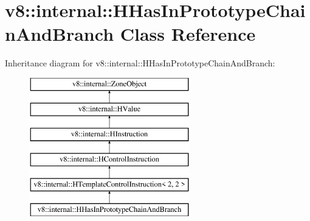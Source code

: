 \hypertarget{classv8_1_1internal_1_1_h_has_in_prototype_chain_and_branch}{}\section{v8\+:\+:internal\+:\+:H\+Has\+In\+Prototype\+Chain\+And\+Branch Class Reference}
\label{classv8_1_1internal_1_1_h_has_in_prototype_chain_and_branch}
Inheritance diagram for v8\+:\+:internal\+:\+:H\+Has\+In\+Prototype\+Chain\+And\+Branch\+:\begin{figure}[H]
\begin{center}
\leavevmode
\includegraphics[height=6.000000cm]{classv8_1_1internal_1_1_h_has_in_prototype_chain_and_branch}
\end{center}
\end{figure}
